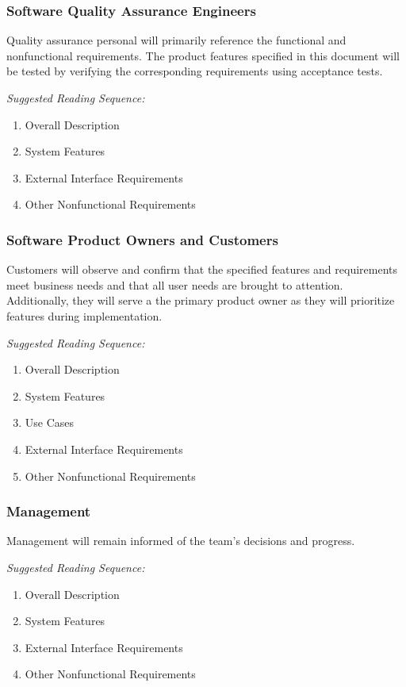 \documentclass[12pt,oneside,letterpaper]{article}
\begin{document}
\subsubsection{Software Quality Assurance Engineers}
Quality assurance personal will primarily reference the functional and nonfunctional requirements. The product features specified in this document will be tested by verifying the corresponding requirements using acceptance tests.\newline

\textit{Suggested Reading Sequence:}
\begin{enumerate}
\item Overall Description
\item System Features
\item External Interface Requirements
\item Other Nonfunctional Requirements
\end{enumerate}

\subsubsection{Software Product Owners and Customers}
Customers will observe and confirm that the specified features and requirements meet business needs and that all user needs are brought to attention. Additionally, they will serve a the primary product owner as they will prioritize features during implementation.\newline

\textit{Suggested Reading Sequence:}
\begin{enumerate}
\item Overall Description
\item System Features
\item Use Cases
\item External Interface Requirements
\item Other Nonfunctional Requirements
\end{enumerate}

\subsubsection{Management}
Management will remain informed of the team’s decisions and progress.\newline

\textit{Suggested Reading Sequence:}
\begin{enumerate}
\item Overall Description
\item System Features
\item External Interface Requirements
\item Other Nonfunctional Requirements
\end{enumerate}
\end{document}
